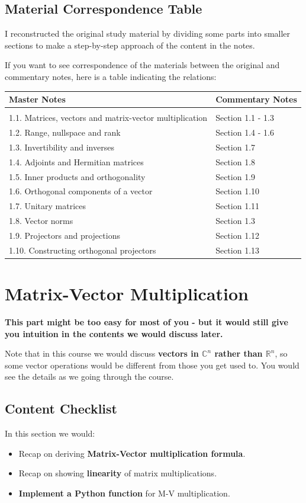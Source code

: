 \subsection*{Material Correspondence Table}
I reconstructed the original study material by dividing some parts into smaller sections to make a step-by-step approach of the content in the notes. \smallskip

\noindent If you want to see correspondence of the materials between the original and commentary notes, here is a table indicating the relations: \bigskip

\noindent 
\begin{tabular}{ll}
  Master Notes & Commentary Notes \\
  \hline \\
  1.1. Matrices, vectors and matrix-vector multiplication & Section 1.1 - 1.3 \\
  1.2. Range, nullspace and rank & Section 1.4 - 1.6 \\
  1.3. Invertibility and inverses & Section 1.7  \\
  1.4. Adjoints and Hermitian matrices & Section 1.8 \\
  1.5. Inner products and orthogonality & Section 1.9 \\
  1.6. Orthogonal components of a vector & Section 1.10\\
  1.7. Unitary matrices & Section 1.11  \\
  1.8. Vector norms & Section 1.3\\
  1.9. Projectors and projections &  Section 1.12 \\
  1.10. Constructing orthogonal projectors  & Section 1.13
  \end{tabular}
\newpage
\section{Matrix-Vector Multiplication}%
\textbf{This part might be too easy for most of you - but it would still give you intuition in the contents we would discuss later.}\medskip

\noindent Note that in this course we would discuss \textbf{vectors in \(\mathbb{C}^{n}\) rather than \(\mathbb{R}^{n}\)}, so some vector operations would be different from those you get used to. You would see the details as we going through the course.
\subsection*{Content Checklist}
\noindent In this section we would:
\begin{itemize}
  \item Recap on deriving \textbf{Matrix-Vector multiplication formula}. 
  \item Recap on showing \textbf{linearity} of matrix multiplications. 
  \item \textbf{Implement a Python function} for M-V multiplication.
\end{itemize}
